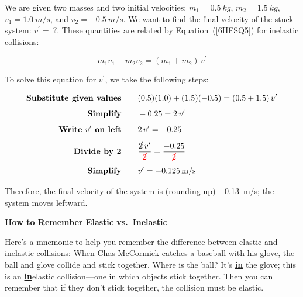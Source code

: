 \documentclass[main.tex]{subfiles}
\begin{document}
\Solution We are given two masses and two initial velocities: $m_1 = \SI{0.5}{kg}$, $m_2 = \SI{1.5}{kg}$, $v_1 = \SI{+1.0}{m/s}$, and $v_2 = \SI{-0.5}{m/s}$.  We want to find the final velocity of the stuck system: $v^{\prime} =\ ?$. These quantities are related by Equation~(\ref{6HFSQ5}) for inelastic collisions:
\vspace{-1ex}

\begin{equation*}
    m_1 v_1 + m_2 v_2 = (m_1 + m_2)\,v^{\prime}
\end{equation*}

To solve this equation for $v^{\prime}$, we take the following steps:
\vspace{-1ex}

\begin{align*}
    \textbf{Substitute given values} \qquad & (0.5)(1.0) + (1.5)(-0.5) = (0.5 + 1.5)\,v^{\prime}\\[1ex]
    \textbf{Simplify} \qquad & -0.25 = 2\,v^{\prime}\\[1ex]
    \textbf{Write $v^{\prime}$ on left} \qquad & 2\,v^{\prime} = -0.25\\[1ex]
    \textbf{Divide by 2} \qquad & \frac{\cancel{2}\,v^{\prime}}{\textcolor{red}{\cancel{2}}} = \frac{-0.25}{\textcolor{red}{\cancel{2}}}\\[1ex]
    \textbf{Simplify} \qquad & v^{\prime} = -\SI{0.125}{m/s}
\end{align*}

Therefore, the final velocity of the system is (rounding up) \SI{-0.13}{m/s}; the system moves leftward.

\cyanhrule

\begin{mdframed}[backgroundcolor=black!10]
\textbf{How to Remember Elastic vs.~Inelastic}
\vspace{1ex}

Here's a mnemonic to help you remember the difference between elastic and inelastic collisions: When \href{https://youtu.be/UOyDnrAZmhA?t=14}{Chas McCormick} catches a baseball with his glove, the ball and glove collide and stick together. Where is the ball? It's \underline{\textbf{in}} the glove; this is an \underline{\textbf{in}}elastic collision---one in which objects stick together. Then you can remember that if they don't stick together, the collision must be elastic.
\end{mdframed}


\clearpage
\printnoidxglossaries
\end{document}
